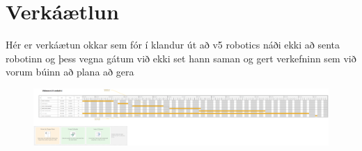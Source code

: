 \section{Verkáætlun}
Hér er verkáætun okkar sem fór í klandur út að v5 robotics náði ekki að senta robotinn og þess vegna gátum við ekki set hann saman og gert verkefninn sem við vorum búinn að plana að gera
\begin{figure}[h]
\includegraphics[scale=.3]{img/gant}
\end{figure}